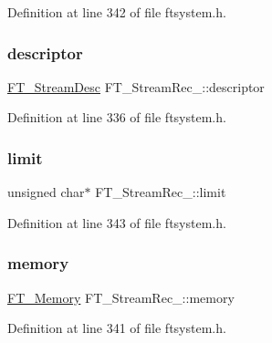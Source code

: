 Definition at line 342 of file ftsystem.\+h.

\mbox{\label{struct_f_t___stream_rec___a361c44020eace21cc453b51852d8cc4f}} 
\subsubsection{\texorpdfstring{descriptor}{descriptor}}
{\footnotesize\ttfamily \mbox{\hyperlink{ftsystem_8h_ad7ddff377e42bfb38bec17f11fa75911}{F\+T\+\_\+\+Stream\+Desc}} F\+T\+\_\+\+Stream\+Rec\+\_\+\+::descriptor}



Definition at line 336 of file ftsystem.\+h.

\mbox{\label{struct_f_t___stream_rec___aff006e6ee3bbc2741a2c4ae79b1bad3a}} 
\subsubsection{\texorpdfstring{limit}{limit}}
{\footnotesize\ttfamily unsigned char$\ast$ F\+T\+\_\+\+Stream\+Rec\+\_\+\+::limit}



Definition at line 343 of file ftsystem.\+h.

\mbox{\label{struct_f_t___stream_rec___a51e2be0d80d70b532aae3face5461e7e}} 
\subsubsection{\texorpdfstring{memory}{memory}}
{\footnotesize\ttfamily \mbox{\hyperlink{ftsystem_8h_a67ec7ea35cde99a89a65e9f827a9ad3a}{F\+T\+\_\+\+Memory}} F\+T\+\_\+\+Stream\+Rec\+\_\+\+::memory}



Definition at line 341 of file ftsystem.\+h.

\mbox{\label{struct_f_t___stream_rec___afd75c5de5ed78c484a200a7e97ef5a41}} 
